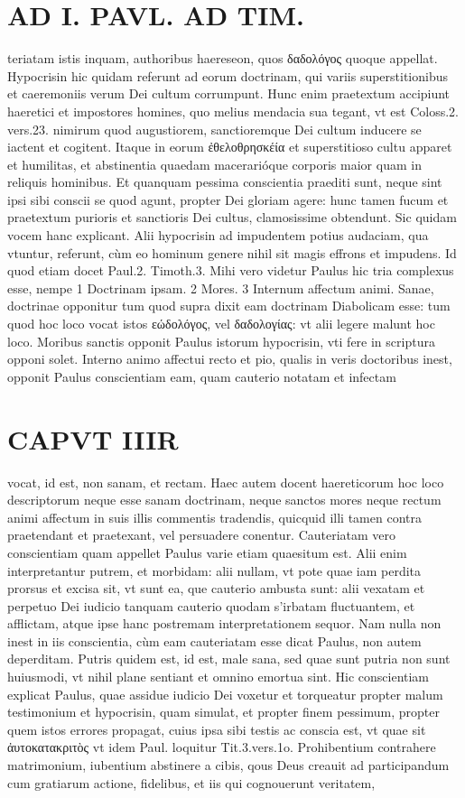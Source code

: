 \documentclass{article}
\begin{document}
\begin{pages}
\section*{AD I. PAVL. AD TIM. }
\marginpar{[ p.104 ]}\pstart teriatam istis inquam, authoribus haereseon, quos δαδολόγος quoque appellat.  \pend\pstart Hypocrisin hic quidam referunt ad eorum doctrinam, qui variis superstitionibus et caeremoniis verum Dei cultum corrumpunt. Hunc enim praetextum accipiunt haeretici et impostores homines, quo melius mendacia sua tegant, vt est Coloss.2. vers.23. nimirum quod augustiorem, sanctioremque Dei cultum inducere se iactent et cogitent. Itaque in eorum ἐθελοθρησκέία et superstitioso cultu apparet et humilitas, et abstinentia quaedam macerarióque corporis maior quam in reliquis hominibus. Et quanquam pessima conscientia praediti sunt, neque sint ipsi sibi conscii se quod agunt, propter Dei gloriam agere: hunc tamen fucum et praetextum purioris et sanctioris Dei cultus, clamosissime obtendunt. Sic quidam vocem hanc explicant.  \pend\pstart Alii hypocrisin ad impudentem potius audaciam, qua vtuntur, referunt, cùm eo hominum genere nihil sit magis effrons et impudens. Id quod etiam docet Paul.2. Timoth.3. Mihi vero videtur Paulus hic tria complexus esse, nempe 1 Doctrinam ipsam. 2 Mores. 3 Internum affectum animi. Sanae, doctrinae opponitur tum quod supra dixit eam doctrinam Diabolicam esse: tum quod hoc loco vocat istos εώδολόγος, vel δαδολογίας: vt alii legere malunt hoc loco. Moribus sanctis opponit Paulus istorum hypocrisin, vti fere in scriptura opponi solet.  \pend\pstart Interno animo affectui recto et pio, qualis in veris doctoribus inest, opponit Paulus conscientiam eam, quam cauterio notatam et infectam  \pend
\section*{CAPVT  IIIR }
\marginpar{[ p.185 ]}\pstart vocat, id est, non sanam, et rectam. Haec autem docent haereticorum hoc loco descriptorum neque esse sanam doctrinam, neque sanctos mores neque rectum animi affectum in suis illis commentis tradendis, quicquid illi tamen contra praetendant et praetexant, vel persuadere conentur.  \pend\pstart Cauteriatam vero conscientiam quam appellet Paulus varie etiam quaesitum est. Alii enim interpretantur putrem, et morbidam: alii nullam, vt pote quae iam perdita prorsus et excisa sit, vt sunt ea, que cauterio ambusta sunt: alii vexatam et perpetuo Dei iudicio tanquam cauterio quodam s'irbatam fluctuantem, et afflictam, atque ipse hanc postremam interpretationem sequor. Nam nulla non inest in iis conscientia, cùm eam cauteriatam esse dicat Paulus, non autem deperditam. Putris quidem est, id est, male sana, sed quae sunt putria non sunt huiusmodi, vt nihil plane sentiant et omnino emortua sint. Hic conscientiam explicat Paulus, quae assidue iudicio Dei voxetur et torqueatur propter malum testimonium et hypocrisin, quam simulat, et propter finem pessimum, propter quem istos errores propagat, cuius ipsa sibi testis ac conscia est, vt quae sit ἀυτοκατακριτὸς vt idem Paul. loquitur Tit.3.vers.1o.  \pend\pstart * Prohibentium contrahere matrimonium, iubentium abstinere a cibis, qous Deus creauit ad participandum cum gratiarum actione, fidelibus, et iis qui cognouerunt veritatem,  \pend

\end{pages}
\end{document}
